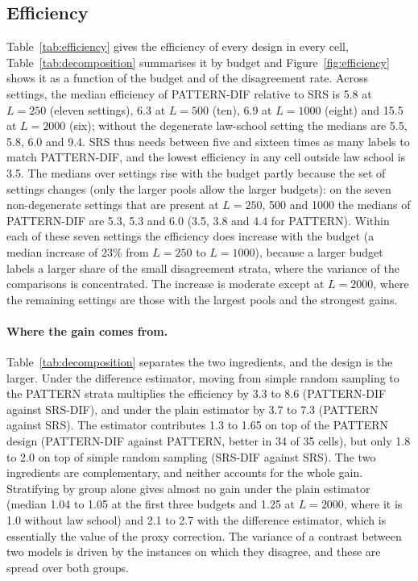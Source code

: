 \subsection{Efficiency}
Table~\ref{tab:efficiency} gives the efficiency of every design in every cell, Table~\ref{tab:decomposition} summarises it by budget and Figure~\ref{fig:efficiency} shows it as a function of the budget and of the disagreement rate. Across settings, the median efficiency of PATTERN-DIF relative to SRS is 5.8 at $L=250$ (eleven settings), 6.3 at $L=500$ (ten), 6.9 at $L=1000$ (eight) and 15.5 at $L=2000$ (six); without the degenerate law-school setting the medians are 5.5, 5.8, 6.0 and 9.4. SRS thus needs between five and sixteen times as many labels to match PATTERN-DIF, and the lowest efficiency in any cell outside law school is 3.5. The medians over settings rise with the budget partly because the set of settings changes (only the larger pools allow the larger budgets): on the seven non-degenerate settings that are present at $L=250$, 500 and 1000 the medians of PATTERN-DIF are 5.3, 5.3 and 6.0 (3.5, 3.8 and 4.4 for PATTERN). Within each of these seven settings the efficiency does increase with the budget (a median increase of 23\% from $L=250$ to $L=1000$), because a larger budget labels a larger share of the small disagreement strata, where the variance of the comparisons is concentrated. The increase is moderate except at $L=2000$, where the remaining settings are those with the largest pools and the strongest gains.

\paragraph{Where the gain comes from.} Table~\ref{tab:decomposition} separates the two ingredients, and the design is the larger. Under the difference estimator, moving from simple random sampling to the PATTERN strata multiplies the efficiency by 3.3 to 8.6 (PATTERN-DIF against SRS-DIF), and under the plain estimator by 3.7 to 7.3 (PATTERN against SRS). The estimator contributes 1.3 to 1.65 on top of the PATTERN design (PATTERN-DIF against PATTERN, better in 34 of 35 cells), but only 1.8 to 2.0 on top of simple random sampling (SRS-DIF against SRS). The two ingredients are complementary, and neither accounts for the whole gain. Stratifying by group alone gives almost no gain under the plain estimator (median 1.04 to 1.05 at the first three budgets and 1.25 at $L=2000$, where it is 1.0 without law school) and 2.1 to 2.7 with the difference estimator, which is essentially the value of the proxy correction. The variance of a contrast between two models is driven by the instances on which they disagree, and these are spread over both groups.


